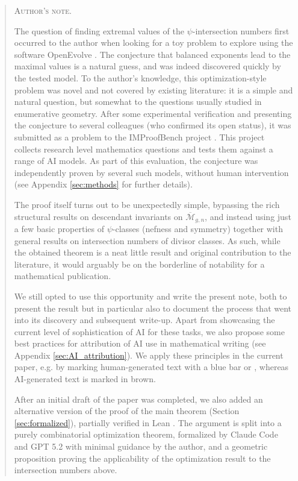 \documentclass[12pt,reqno]{amsart}
\theoremstyle{definition}
\newcommand{\humaninline}[1]{{\color{humancolor}\uwave{#1}}}
\newcommand{\aiinline}[1]{{\color{aicolor}\uwave{#1}}}
\newenvironment{authornote}{%
  \begin{quotation}
  \footnotesize
  \noindent\textsc{Author's note.}\enspace\ignorespaces
}{%
  \end{quotation}
}
\newcommand{\Mbar}{\overline{\mathcal{M}}}
\begin{document}
\begin{authornote}
\begin{humanparagraph}
The question of finding extremal values of the $\psi$-intersection  numbers first occurred to the author when looking for a toy problem to explore using the software OpenEvolve \cite{openevolve}. The conjecture that balanced exponents lead to the maximal values is a natural guess, and was indeed discovered quickly by the tested model. 
To the author's knowledge, this optimization-style problem was novel and not covered by existing literature: it is a simple and natural question, but somewhat \aiinline{orthogonal} to the questions usually studied in enumerative geometry.
After some experimental verification and presenting the conjecture to several colleagues (who confirmed its open status), it was submitted as a problem to the IMProofBench  project \cite{IMProofBench}. This project collects research level mathematics questions and tests them against a range of AI models. As part of this evaluation, the conjecture was independently proven by several such models, without human intervention (see Appendix \ref{sec:methods} for further details). 

The proof itself turns out to be unexpectedly simple, bypassing the rich structural results on descendant invariants on $\Mbar_{g,n}$, and instead using just a few basic properties of $\psi$-classes (nefness and symmetry) together with general results on intersection numbers of divisor classes.
As such, while the obtained theorem is a neat little result and original contribution to the literature, it would arguably be on the borderline of notability for a mathematical publication.

We still opted to use this opportunity and write the present note, both to present the result but in particular also to document the process that went into its discovery and subsequent write-up. Apart from showcasing the current level of sophistication of AI for these tasks, we also propose some best practices for attribution of AI use in mathematical writing (see Appendix \ref{sec:AI_attribution}). We apply these principles in the current paper, e.g. by marking human-generated text with a blue bar or \humaninline{underlines}, whereas AI-generated text is marked in brown.

After an initial draft of the paper was completed, we also added an alternative version of the proof of the main theorem (Section \ref{sec:formalized}), partially verified in Lean \cite{lean4}. The argument is split into a purely combinatorial optimization theorem, formalized by Claude Code and GPT 5.2 with minimal guidance by the author, and a geometric proposition proving the applicability of the optimization result to the intersection numbers above.
\end{humanparagraph}
\end{authornote}
\clearpage
\end{document}
